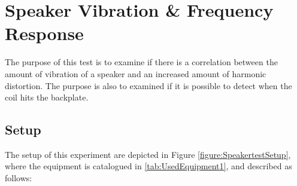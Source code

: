 \chapter{Speaker Vibration \& Frequency Response}\label{app:journal_speaker_test}

The purpose of this test is to examine if there is a correlation between the amount of vibration of a speaker and an increased amount of harmonic distortion. The purpose is also to examined if it is possible to detect when the coil hits the backplate. 




\section{Setup}

The setup of this experiment are depicted in Figure \ref{figure:SpeakertestSetup}, where the equipment is catalogued in \autoref{tab:UsedEquipment1}, and described as follows:

